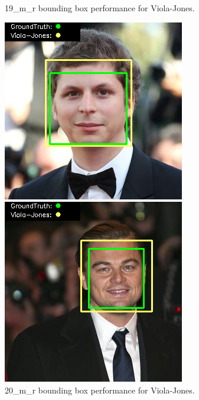 \documentclass{l4proj}
\begin{document}
\begin{appendices}
\begin{figure}[h!]
\begin{minipage}{0.49\textwidth}
    \caption{19\_m\_r bounding box performance for Viola-Jones.}
    \label{whoopi_result}
  \end{minipage}
\end{figure}

\begin{figure}[h!]
  \centering
  \begin{minipage}{0.49\textwidth}
    \centering
     \includegraphics[width=\textwidth]{images/appendix/viola/20.png}
    \caption{20\_m\_r bounding box performance for Viola-Jones.}
    \label{whoopi_result}
  \end{minipage}
    \hfill
    \begin{minipage}{0.49\textwidth}
    \centering
     \includegraphics[width=\textwidth]{images/appendix/viola/21.png}

\end{minipage}
\end{figure}
\end{appendices}
\end{document}
